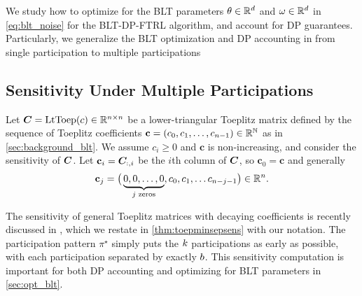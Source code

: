  \label{sec:blt_mp}
We study how to optimize for the BLT parameters $\theta \in \mathbb{R}^d$ and $\omega \in \mathbb{R}^d$ in \cref{eq:blt_noise} for the BLT-DP-FTRL algorithm, and account for DP guarantees. Particularly, we generalize the BLT optimization and DP accounting in \citep{mcmahan2024efficient} from single participation to multiple participations

\subsection{Sensitivity Under Multiple Participations}\label{sec:sensitivity}


\newcommand{\cc}{\mathbf{c}}

Let ${\bm{C}} = \text{LtToep}(c) \in \mathbb{R}^{n \times n}$ be a lower-triangular Toeplitz matrix defined by the sequence of Toeplitz coefficients $\cc = (c_0, c_1, \dots, c_{\nd-1}) \in \R^\N$ as in \cref{sec:background_blt}. We assume $c_i \ge 0$ and $\cc$ is non-increasing, and consider the sensitivity of ${\bm{C}}$. 
Let $\cc_i = \bfC\idx{:}{i}$ be the $i$th column of ${\bm{C}}$, so $\cc_0 = \cc$ and generally 
\[
\cc_j = \big(\underbrace{0, 0, \dots, 0}_{\text{$j$ zeros}}, c_0, c_1, \dots c_{n-j-1}\big) \in \R^\nd.
\]

\newcommand{\pistar}{\pi^\star}
\newcommand{\ustar}{\ind(\pistar)}
\newcommand{\ii}{{\tilde{\imath}}}
\newcommand{\kk}{k}

The sensitivity of general Toeplitz matrices with decaying coefficients is recently discussed in \citet[Thm. 2]{kalinin2024banded}, which we restate in \cref{thm:toepminsepsens} with our notation. The participation pattern $\pistar$ simply puts the $k$ participations as early as possible, with each participation separated by exactly $b$. This sensitivity computation is important for both DP accounting and optimizing for BLT parameters in \cref{sec:opt_blt}. 

